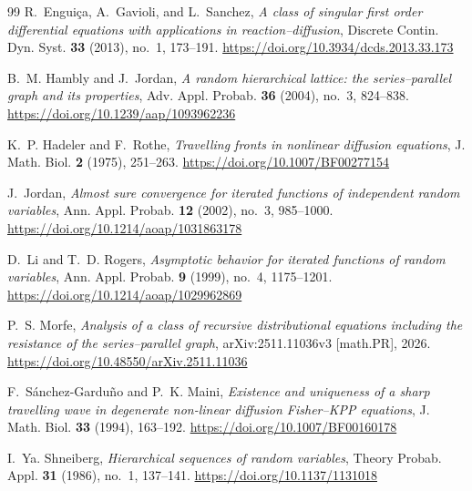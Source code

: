 \documentclass[12pt,preprint]{amsart}
\numberwithin{equation}{section}
\theoremstyle{plain}
\theoremstyle{definition}
\begin{document}
\begin{thebibliography}{99}
%
%
%
%
%
%
%
%
R.~Engui\c{c}a, A.~Gavioli, and L.~Sanchez,
\emph{A class of singular first order differential equations with applications
in reaction--diffusion},
Discrete Contin. Dyn. Syst. \textbf{33} (2013), no.~1, 173--191.
\url{https://doi.org/10.3934/dcds.2013.33.173}
%
%

B.~M. Hambly and J.~Jordan,
\emph{A random hierarchical lattice: the series--parallel graph and its
properties},
Adv. Appl. Probab. \textbf{36} (2004), no.~3, 824--838.
\url{https://doi.org/10.1239/aap/1093962236}

K.~P. Hadeler and F.~Rothe,
\emph{Travelling fronts in nonlinear diffusion equations},
J. Math. Biol. \textbf{2} (1975), 251--263.
\url{https://doi.org/10.1007/BF00277154}

J.~Jordan,
\emph{Almost sure convergence for iterated functions of independent random
variables},
Ann. Appl. Probab. \textbf{12} (2002), no.~3, 985--1000.
\url{https://doi.org/10.1214/aoap/1031863178}

D.~Li and T.~D. Rogers,
\emph{Asymptotic behavior for iterated functions of random variables},
Ann. Appl. Probab. \textbf{9} (1999), no.~4, 1175--1201.
\url{https://doi.org/10.1214/aoap/1029962869}

P.~S. Morfe,
\emph{Analysis of a class of recursive distributional equations including the
resistance of the series--parallel graph},
arXiv:2511.11036v3 [math.PR], 2026.
\url{https://doi.org/10.48550/arXiv.2511.11036}

F.~S\'anchez-Gardu\~no and P.~K. Maini,
\emph{Existence and uniqueness of a sharp travelling wave in degenerate
non-linear diffusion Fisher--KPP equations},
J. Math. Biol. \textbf{33} (1994), 163--192.
\url{https://doi.org/10.1007/BF00160178}

I.~Ya. Shneiberg,
\emph{Hierarchical sequences of random variables},
Theory Probab. Appl. \textbf{31} (1986), no.~1, 137--141.
\url{https://doi.org/10.1137/1131018}

\end{thebibliography}
\end{document}
